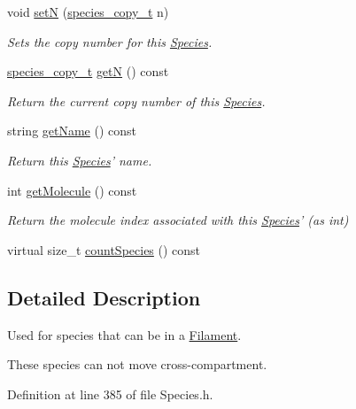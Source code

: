\begin{DoxyCompactItemize}
void \hyperlink{classSpecies_a88de7cf5130cb9cee2da3585374db654}{set\+N} (\hyperlink{common_8h_a3503f321fd36304ee274141275cca586}{species\+\_\+copy\+\_\+t} n)
\begin{DoxyCompactList}\small\item\em Sets the copy number for this \hyperlink{classSpecies}{Species}. \end{DoxyCompactList}\item 
\hyperlink{common_8h_a3503f321fd36304ee274141275cca586}{species\+\_\+copy\+\_\+t} \hyperlink{classSpecies_aea7327b3fed261c705b4d32b9973aa58}{get\+N} () const 
\begin{DoxyCompactList}\small\item\em Return the current copy number of this \hyperlink{classSpecies}{Species}. \end{DoxyCompactList}\item 
string \hyperlink{classSpecies_a28fa239dded841133760ff9c47af63a1}{get\+Name} () const 
\begin{DoxyCompactList}\small\item\em Return this \hyperlink{classSpecies}{Species}' name. \end{DoxyCompactList}\item 
int \hyperlink{classSpecies_a1ea8969c51bc69879891a408f9e197c7}{get\+Molecule} () const 
\begin{DoxyCompactList}\small\item\em Return the molecule index associated with this \hyperlink{classSpecies}{Species}' (as int) \end{DoxyCompactList}\item 
virtual size\+\_\+t \hyperlink{classSpecies_a1864e111fe0304ca8d6b2d0d955a7356}{count\+Species} () const 
\end{DoxyCompactItemize}


\subsection{Detailed Description}
Used for species that can be in a \hyperlink{classFilament}{Filament}. 

These species can not move cross-\/compartment. 

Definition at line 385 of file Species.\+h.



